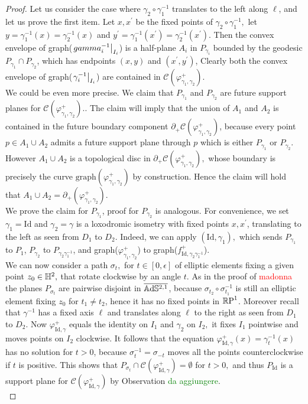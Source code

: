 \begin{proof}
    Let us consider the case where $\gamma_2\circ\gamma_1^{-1}$ translates to the left along $\ell$, and let us prove the first item. Let $x,x^{\prime}$ be the fixed points of $\gamma_2\circ\gamma_1^{-1},$ let $y=\gamma_1^{-1}(x)=\gamma_2^{-1}(x)$ and $y^{\prime}=\gamma_1^{-1}(x^{\prime})=\gamma_2^{-1}(x^{\prime})$. Then the convex envelope of graph($\restr{gamma_i^{-1}}{I_i}$) is a half-plane $A_i$ in $P_{\gamma_i}$ bounded by the geodesic $P_{\gamma_1}\cap P_{\gamma_2}$, which has endpoints $(x,y)$ and $(x^{\prime} ,y^{\prime})$, Clearly both the convex envelope of graph($\restr{\gamma_i^{-1}}{I_i}$) are contained in $\mathcal{C}(\varphi_{\gamma_1,\gamma_2}^{+}).$\\
    We could be even more precise. We claim that $P_{\gamma_1}$ and $P_{\gamma_2}$ are future support planes for $\mathcal{C}(\varphi_{\gamma_1,\gamma_2}^{+}).$. The claim will imply that the union of $A_1$ and $A_2$ is contained in the future boundary component $\partial_+\mathcal{C}(\varphi_{\gamma_1,\gamma_2}^{+})$, because every point $p\in A_1\cup A_2$ admits a future support plane through $p$ which is either $P_{\gamma_1}$ or $P_{\gamma_2}$. However $A_1\cup A_2$ is a topological disc in $\partial_+\mathcal{C}(\varphi_{\gamma_1,\gamma_2}^{+}),$ whose boundary is precisely the curve $\text{graph}(\varphi_{\gamma_1,\gamma_2}^{+})$ by construction. Hence the claim will hold that $A_1\cup A_2=\partial_+(\varphi_{\gamma_1,\gamma_2}^{+}).$\\
    We prove the claim for $P_{\gamma_1}$, proof for $P_{\gamma_2}$ is analogous. For convenience, we set $\gamma_1=\text{Id}$ and $\gamma_2=\gamma$ is a loxodromic isometry with fixed points $x,x^{\prime}$, translating to the left as seen from $D_1$ to $D_2$. Indeed, we can apply $(\text{Id},\gamma_1),$ which sends $P_{\gamma_1}$ to $P_1$, $P_{\gamma_2}$ to $P_{\gamma_2\gamma_1^{-1}}$, and graph($\varphi_{\gamma_1,\gamma_2}^+$) to graph($f_{\text{Id},\gamma_2\gamma_1^{-1}}^+$). \\
    We can now consider a path $\sigma_t,$ for $t\in[0,\epsilon]$ of elliptic elements fixing a given point $z_0\in\H^2,$ that rotate clockwise by an angle $t.$ As in the proof of \textcolor{red}{madonna} the planes $P_{\sigma_t}$ are pairwise disjoint in $\overline{\A^{2,1}}$, because $\sigma_{t_2}\circ\sigma_{t_1}^{-1}$ is still an elliptic element fixing $z_0$ for $t_1\neq t_2$, hence it has no fixed points in $\S$. Moreover recall that $\gamma^{-1}$ has a fixed axis $\ell$ and translates along $\ell$ to the right as seen from $D_1$ to $D_2$. Now $\varphi_{\text{Id},\gamma}^+$ equals the identity on $I_1$ and $\gamma_2$ on $I_2,$ it fixes $I_1$ pointwise and moves points on $I_2$ clockwise. It follows that the equation $\varphi_{\text{Id},\gamma}^+(x)=\gamma_t^{-1}(x)$ has no solution for $t>0$, because $\sigma_{t}^{-1}=\sigma_{-t}$ moves all the points counterclockwise if $t$ is positive. This shows that $P_{\sigma_t}\cap\mathcal{C}(\varphi^+_{\text{Id},\gamma})=\emptyset$ for $t>0,$ and thus $P_{\text{Id}}$ is a support plane for $\mathcal{C}(\varphi^+_{\text{Id},\gamma})$ by Observation \textcolor{green}{da aggiungere}.\\

\end{proof}
